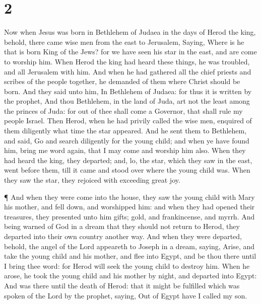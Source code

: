 \hypertarget{section-1}{%
\section{2}\label{section-1}}

 Now when Jesus was born in Bethlehem of Judaea in the days
of Herod the king, behold, there came wise men from the east to
Jerusalem,  Saying, Where is he that is born King of the
Jews? for we have seen his star in the east, and are come to worship
him.  When Herod the king had heard these things, he was
troubled, and all Jerusalem with him.  And when he had
gathered all the chief priests and scribes of the people together, he
demanded of them where Christ should be born.  And they said
unto him, In Bethlehem of Judaea: for thus it is written by the prophet,
 And thou Bethlehem, in the land of Juda, art not the least
among the princes of Juda: for out of thee shall come a Governor, that
shall rule my people Israel.  Then Herod, when he had
privily called the wise men, enquired of them diligently what time the
star appeared.  And he sent them to Bethlehem, and said, Go
and search diligently for the young child; and when ye have found him,
bring me word again, that I may come and worship him also. 
When they had heard the king, they departed; and, lo, the star, which
they saw in the east, went before them, till it came and stood over
where the young child was.  When they saw the star, they
rejoiced with exceeding great joy.

 ¶ And when they were come into the house, they saw the
young child with Mary his mother, and fell down, and worshipped him: and
when they had opened their treasures, they presented unto him gifts;
gold, and frankincense, and myrrh.  And being warned of God
in a dream that they should not return to Herod, they departed into
their own country another way.  And when they were
departed, behold, the angel of the Lord appeareth to Joseph in a dream,
saying, Arise, and take the young child and his mother, and flee into
Egypt, and be thou there until I bring thee word: for Herod will seek
the young child to destroy him.  When he arose, he took the
young child and his mother by night, and departed into Egypt:
 And was there until the death of Herod: that it might be
fulfilled which was spoken of the Lord by the prophet, saying, Out of
Egypt have I called my son.

